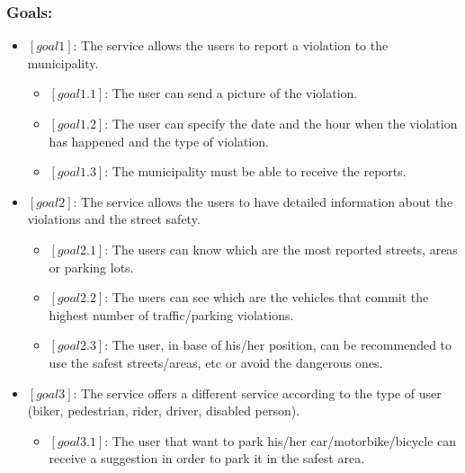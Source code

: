 \documentclass[titlepage]{article}
\begin{document}
\subsubsection{Goals:}
\begin{itemize}
\item $[goal 1]$:  The service allows the users to report a violation to the municipality.
\begin{itemize}

	\item $[goal 1.1]$: The user can send a picture of the 			violation.
	
	\item $[goal 1.2]$: The user can specify the date and the 						hour when the violation has happened 							and the type of violation.
	

	\item $[goal 1.3 ]$: The municipality must be able to     	receive the reports.  \\
	
\end{itemize}

\item $[goal 2]$: The service allows the users to have detailed information about the violations and the street safety.
      \begin{itemize}
      	\item $[goal 2.1]$: The users can know which are the 			most reported streets, areas or parking lots.
      	
      	\item $[goal 2.2]$: The users can see which are the 				vehicles that commit the highest number
		of traffic/parking violations.
		
		\item $[goal 2.3]$: The user, in base of his/her 				position, can be recommended to use the safest 					streets/areas, etc or avoid the dangerous ones.\\

      \end{itemize}
\item $[goal 3]$: The service offers a different service according 					  to the type of user (biker, pedestrian, 						  rider, driver, disabled person).
	\begin{itemize}
	\item $[goal 3.1]$: The user that want to park his/her  							car/motorbike/bicycle can receive a                           						suggestion in order to park it in the safest area.\\
	\end{itemize}




\end{itemize}
\end{document}
